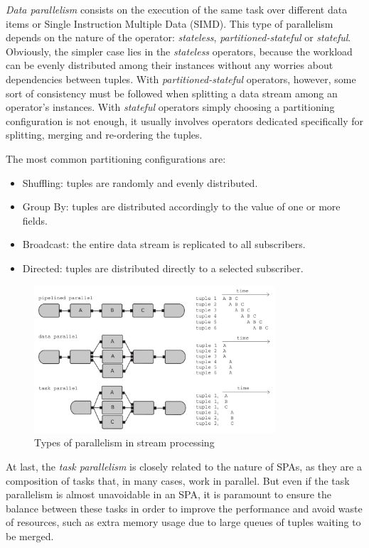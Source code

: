 \documentclass[ppgc,diss,english]{iiufrgs}
\begin{document}
\emph{Data parallelism} consists on the execution of the same task over different data items or Single Instruction Multiple Data (SIMD). This type of parallelism depends on the nature of the operator: \emph{stateless}, \emph{partitioned-stateful} or \emph{stateful}. Obviously, the simpler case lies in the \emph{stateless} operators, because the workload can be evenly distributed among their instances without any worries about dependencies between tuples. With \emph{partitioned-stateful} operators, however, some sort of consistency must be followed when splitting a data stream among an operator's instances. With \emph{stateful} operators simply choosing a partitioning configuration is not enough, it usually involves operators dedicated specifically for splitting, merging and re-ordering the tuples.

The most common partitioning configurations are:

\begin{itemize}
\item Shuffling: tuples are randomly and evenly distributed.
\item Group By: tuples are distributed accordingly to the value of one or more fields.
\item Broadcast: the entire data stream is replicated to all subscribers.
\item Directed: tuples are distributed directly to a selected subscriber.
\end{itemize}

\begin{figure}[!ht]
	\centering
	\includegraphics[width=0.8\textwidth]{images/sps_parallelism.png}
	\caption[Types of parallelism in stream processing]{Types of parallelism in stream processing \cite{andrade2014fundamentals}}
	\label{fig:sps_parallelism}
\end{figure}

At last, the \emph{task parallelism} is closely related to the nature of SPAs, as they are a composition of tasks that, in many cases, work in parallel. But even if the task parallelism is almost unavoidable in an SPA, it is paramount to ensure the balance between these tasks in order to improve the performance and avoid waste of resources, such as extra memory usage due to large queues of tuples waiting to be merged.
\end{document}

